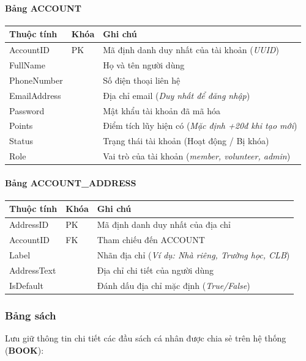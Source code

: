 \paragraph{Bảng ACCOUNT}
{\small
\begin{longtable}{L{0.28\textwidth}L{0.12\textwidth}L{0.52\textwidth}}
\toprule
\textbf{Thuộc tính} & \textbf{Khóa} & \textbf{Ghi chú} \\
\midrule
AccountID & PK & Mã định danh duy nhất của tài khoản (\textit{UUID}) \\
FullName & & Họ và tên người dùng \\
PhoneNumber & & Số điện thoại liên hệ \\
EmailAddress & & Địa chỉ email (\textit{Duy nhất để đăng nhập}) \\
Password & & Mật khẩu tài khoản đã mã hóa \\
Points & & Điểm tích lũy hiện có (\textit{Mặc định +20đ khi tạo mới}) \\
Status & & Trạng thái tài khoản (Hoạt động / Bị khóa) \\
Role & & Vai trò của tài khoản (\textit{member, volunteer, admin}) \\
\bottomrule
\end{longtable}
}

\paragraph{Bảng ACCOUNT\_ADDRESS}
{\small
\begin{longtable}{L{0.28\textwidth}L{0.12\textwidth}L{0.52\textwidth}}
\toprule
\textbf{Thuộc tính} & \textbf{Khóa} & \textbf{Ghi chú} \\
\midrule
AddressID & PK & Mã định danh duy nhất của địa chỉ \\
AccountID & FK & Tham chiếu đến ACCOUNT \\
Label & & Nhãn địa chỉ (\textit{Ví dụ: Nhà riêng, Trường học, CLB}) \\
AddressText & & Địa chỉ chi tiết của người dùng \\
IsDefault & & Đánh dấu địa chỉ mặc định (\textit{True/False}) \\
\bottomrule
\end{longtable}
}

\subsubsection{Bảng sách}

Lưu giữ thông tin chi tiết các đầu sách cá nhân được chia sẻ trên hệ thống (\textbf{BOOK}):

